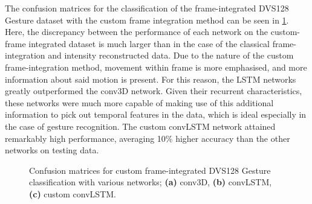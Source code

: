The confusion matrices for the classification of the frame-integrated DVS128 Gesture dataset with the custom frame integration method can be seen in \cref{fig:dvs128_custom_frame_c_matrices}. Here, the discrepancy between the performance of each network on the custom-frame integrated dataset is much larger than in the case of the classical frame-integration and intensity reconstructed data. Due to the nature of the custom frame-integration method, movement within frame is more emphasised, and more information about said motion is present. For this reason, the LSTM networks greatly outperformed the conv3D network. Given their recurrent characteristics, these networks were much more capable of making use of this additional information to pick out temporal features in the data, which is ideal especially in the case of gesture recognition. The custom convLSTM network attained remarkably high performance, averaging 10\% higher accuracy than the other networks on testing data.

\begin{figure}[htb]%
    \centering
    \qquad
    \qquad
    \caption{Confusion matrices for custom frame-integrated DVS128 Gesture classification with various networks; \textbf{(a)} conv3D, \textbf{(b)} convLSTM, \textbf{(c)} custom convLSTM.}%
    \label{fig:dvs128_custom_frame_c_matrices}%
\end{figure}

